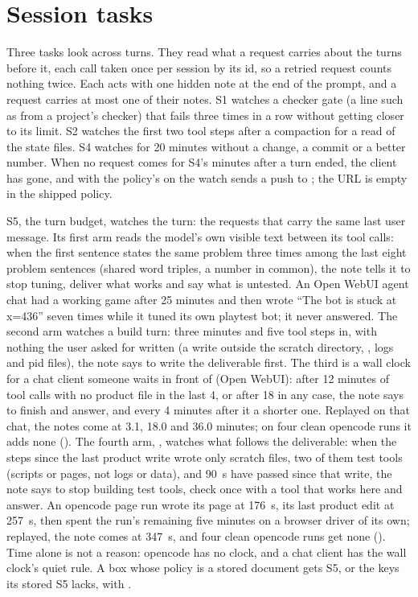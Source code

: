 \section{Session tasks}

Three tasks look across turns. They read what a request carries about the turns before it, each call taken once per session by its id, so a retried request counts nothing twice. Each acts with one hidden note at the end of the prompt, and a request carries at most one of their notes. S1 watches a checker gate (a line such as  from a project's checker) that fails three times in a row without getting closer to its limit. S2 watches the first two tool steps after a compaction for a read of the state files. S4 watches for 20 minutes without a change, a commit or a better number. When no request comes for S4's minutes after a turn ended, the client has gone, and with the policy's  on the watch sends a push to ; the URL is empty in the shipped policy.

S5, the turn budget, watches the turn: the requests that carry the same last user message. Its first arm reads the model's own visible text between its tool calls: when the first sentence states the same problem three times among the last eight problem sentences (shared word triples, a number in common), the note tells it to stop tuning, deliver what works and say what is untested. An Open WebUI agent chat had a working game after 25 minutes and then wrote ``The bot is stuck at x=436'' seven times while it tuned its own playtest bot; it never answered. The second arm watches a build turn: three minutes and five tool steps in, with nothing the user asked for written (a write outside the scratch directory, , logs and pid files), the note says to write the deliverable first. The third is a wall clock for a chat client someone waits in front of (Open WebUI): after 12 minutes of tool calls with no product file in the last 4, or after 18 in any case, the note says to finish and answer, and every 4 minutes after it a shorter one. Replayed on that chat, the notes come at 3.1, 18.0 and 36.0 minutes; on four clean opencode runs it adds none (\measured). The fourth arm, , watches what follows the deliverable: when the steps since the last product write wrote only scratch files, two of them test tools (scripts or pages, not logs or data), and 90~s have passed since that write, the note says to stop building test tools, check once with a tool that works here and answer. An opencode page run wrote its page at 176~s, its last product edit at 257~s, then spent the run's remaining five minutes on a browser driver of its own; replayed, the note comes at 347~s, and four clean opencode runs get none (\measured). Time alone is not a reason: opencode has no clock, and a chat client has the wall clock's quiet rule. A box whose policy is a stored document gets S5, or the keys its stored S5 lacks, with .

